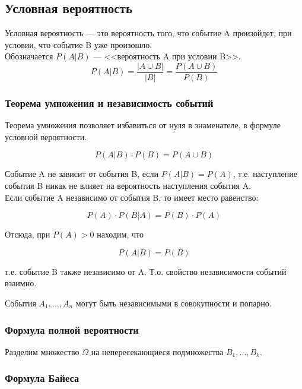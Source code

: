 \subsection{Условная вероятность}
 
\begin{definition}
    Условная вероятность --- это вероятность того, что событие A произойдет, при условии, что событие B уже произошло. \\
    Обозначается $P(A|B)$ --- <<вероятность A при условии B>>. \\
    \begin{equation}
        P(A|B) = \frac{|A\cup B|}{|B|} = \frac{P(A \cup B)}{P(B)}
    \end{equation}
\end{definition}

\subsubsection{Теорема умножения и независимость событий}

Теорема умножения позволяет избавиться от нуля в знаменателе, в формуле условной вероятности.

\begin{equation}
    P(A|B) \cdot P(B) = P(A \cup B)
\end{equation}

Событие A не зависит от события B, если $P(A|B) = P(A)$, т.е. наступление события B никак не влияет на вероятность наступления события A. \\
Если событие A независимо от события B, то имеет место равенство:

\begin{equation}
    P(A) \cdot P(B|A) = P(B) \cdot P(A)
\end{equation}

Отсюда, при $P(A)>0$ находим, что 

\begin{equation}
    P(A|B) = P(B)
\end{equation}

т.е. событие B также независимо от A. Т.о. свойство независимости событий взаимно.

События $A_1, \ldots, A_n$ могут быть независимыми в совокупности и попарно. 

\subsubsection{Формула полной вероятности}

Разделим множество $\Omega$ на непересекающиеся подмножества $B_1, \ldots, B_k$.

\subsubsection{Формула Байеса}

\newpage